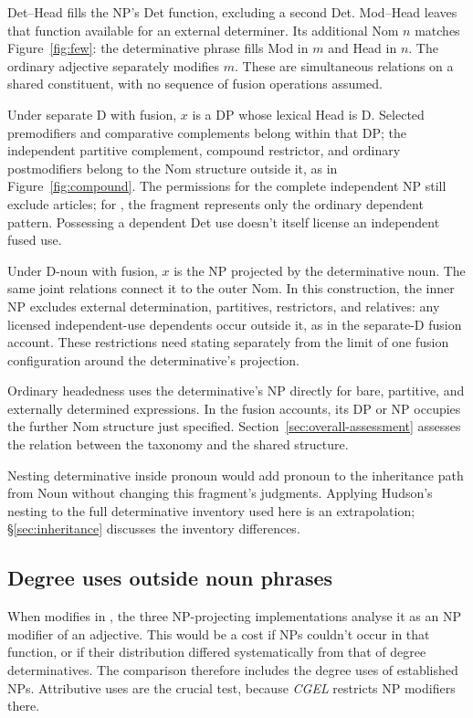 \documentclass[12pt]{article}
\begin{document}
Det--Head fills the NP's Det function, excluding a second Det. Mod--Head leaves that function available for an external determiner. Its additional Nom $n$ matches Figure~\ref{fig:few}: the determinative phrase fills Mod in $m$ and Head in $n$. The ordinary adjective  separately modifies $m$. These are simultaneous relations on a shared constituent, with no sequence of fusion operations assumed.

Under separate D with fusion, $x$ is a DP whose lexical Head is D. Selected premodifiers and comparative complements belong within that DP; the independent partitive complement, compound restrictor, and ordinary postmodifiers belong to the Nom structure outside it, as in Figure~\ref{fig:compound}. The permissions for the complete independent NP still exclude articles; for , the fragment represents only the ordinary dependent pattern. Possessing a dependent Det use doesn't itself license an independent fused use.

Under D-noun with fusion, $x$ is the NP projected by the determinative noun. The same joint relations connect it to the outer Nom. In this construction, the inner NP excludes external determination, partitives, restrictors, and relatives: any licensed independent-use dependents occur outside it, as in the separate-D fusion account. These restrictions need stating separately from the limit of one fusion configuration around the determinative's projection.

Ordinary headedness uses the determinative's NP directly for bare, partitive, and externally determined expressions. In the fusion accounts, its DP or NP occupies the further Nom structure just specified. Section~\ref{sec:overall-assessment} assesses the relation between the taxonomy and the shared structure.

Nesting determinative inside pronoun would add pronoun to the inheritance path from Noun without changing this fragment's judgments. Applying Hudson's nesting to the full determinative inventory used here is an extrapolation; §\ref{sec:inheritance} discusses the inventory differences.

\subsection{Degree uses outside noun phrases}\label{sec:enough}

When  modifies  in , the three NP-projecting implementations analyse it as an NP modifier of an adjective. This would be a cost if NPs couldn't occur in that function, or if their distribution differed systematically from that of degree determinatives. The comparison therefore includes the degree uses of established NPs. Attributive uses are the crucial test, because \textit{CGEL} restricts NP modifiers there.
\end{document}
